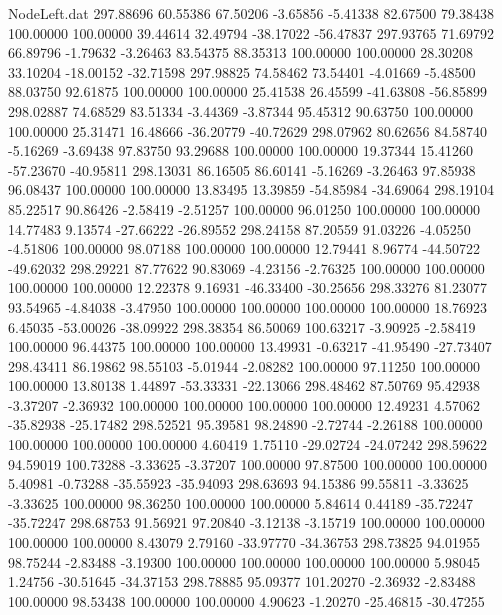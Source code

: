 \begin{filecontents}{NodeLeft.dat}
 297.88696   60.55386   67.50206    -3.65856   -5.41338   82.67500   79.38438  100.00000  100.00000   39.44614   32.49794  -38.17022  -56.47837
 297.93765   71.69792   66.89796    -1.79632   -3.26463   83.54375   88.35313  100.00000  100.00000   28.30208   33.10204  -18.00152  -32.71598
 297.98825   74.58462   73.54401    -4.01669   -5.48500   88.03750   92.61875  100.00000  100.00000   25.41538   26.45599  -41.63808  -56.85899
 298.02887   74.68529   83.51334    -3.44369   -3.87344   95.45312   90.63750  100.00000  100.00000   25.31471   16.48666  -36.20779  -40.72629
 298.07962   80.62656   84.58740    -5.16269   -3.69438   97.83750   93.29688  100.00000  100.00000   19.37344   15.41260  -57.23670  -40.95811
 298.13031   86.16505   86.60141    -5.16269   -3.26463   97.85938   96.08437  100.00000  100.00000   13.83495   13.39859  -54.85984  -34.69064
 298.19104   85.22517   90.86426    -2.58419   -2.51257  100.00000   96.01250  100.00000  100.00000   14.77483    9.13574  -27.66222  -26.89552
 298.24158   87.20559   91.03226    -4.05250   -4.51806  100.00000   98.07188  100.00000  100.00000   12.79441    8.96774  -44.50722  -49.62032
 298.29221   87.77622   90.83069    -4.23156   -2.76325  100.00000  100.00000  100.00000  100.00000   12.22378    9.16931  -46.33400  -30.25656
 298.33276   81.23077   93.54965    -4.84038   -3.47950  100.00000  100.00000  100.00000  100.00000   18.76923    6.45035  -53.00026  -38.09922
 298.38354   86.50069  100.63217    -3.90925   -2.58419  100.00000   96.44375  100.00000  100.00000   13.49931   -0.63217  -41.95490  -27.73407
 298.43411   86.19862   98.55103    -5.01944   -2.08282  100.00000   97.11250  100.00000  100.00000   13.80138    1.44897  -53.33331  -22.13066
 298.48462   87.50769   95.42938    -3.37207   -2.36932  100.00000  100.00000  100.00000  100.00000   12.49231    4.57062  -35.82938  -25.17482
 298.52521   95.39581   98.24890    -2.72744   -2.26188  100.00000  100.00000  100.00000  100.00000    4.60419    1.75110  -29.02724  -24.07242
 298.59622   94.59019  100.73288    -3.33625   -3.37207  100.00000   97.87500  100.00000  100.00000    5.40981   -0.73288  -35.55923  -35.94093
 298.63693   94.15386   99.55811    -3.33625   -3.33625  100.00000   98.36250  100.00000  100.00000    5.84614    0.44189  -35.72247  -35.72247
 298.68753   91.56921   97.20840    -3.12138   -3.15719  100.00000  100.00000  100.00000  100.00000    8.43079    2.79160  -33.97770  -34.36753
 298.73825   94.01955   98.75244    -2.83488   -3.19300  100.00000  100.00000  100.00000  100.00000    5.98045    1.24756  -30.51645  -34.37153
 298.78885   95.09377  101.20270    -2.36932   -2.83488  100.00000   98.53438  100.00000  100.00000    4.90623   -1.20270  -25.46815  -30.47255

\end{filecontents}
